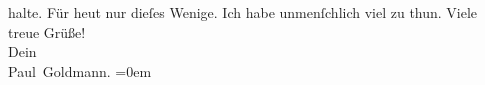 \begin{ledgroupsized}[t]{13cm}
               halte.\pend
           \pstart
           {\pb}Für heut nur dieſes
               Wenige. Ich habe unmenſchlich viel zu thun.\pend
           \pstart
           Viele treue Grüße! {\\[\baselineskip]}Dein {\\[\baselineskip]}\spacefill\mbox{Paul Goldmann.}\pend
           \leftskip=0em{}
         
         \endnumbering{}\end{ledgroupsized}  \newcommand{\dateiname}{L02924}\newcommand{\titel}{Paul Goldmann an Arthur Schnitzler, 18. 7. [1900]}\newcommand{\editorInnen}{Martin Anton Müller und Laura Untner}
      